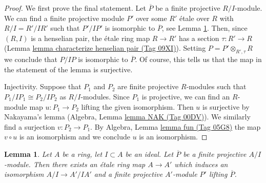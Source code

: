 \documentclass{amsart}
\theoremstyle{plain}
\newtheorem{lemma}[subsection]{Lemma}
\theoremstyle{definition}
\theoremstyle{remark}
\numberwithin{equation}{subsection}
\begin{document}
\begin{proof}
We first prove the final statement. Let $\overline{P}$ be a finite
projective $R/I$-module. We can find a finite projective module $P'$
over some $R'$ \'etale over $R$ with $R/I = R'/IR'$ such that
$P'/IP'$ is isomorphic to $\overline{P}$, see
Lemma \ref{more-algebra-lemma-lift-projective-module}.
Then, since $(R, I)$ is a henselian pair, the \'etale ring map $R \to R'$ has
a section $\tau : R' \to R$ (Lemma \href{https://stacks.math.columbia.edu/tag/09XI}{lemma characterize henselian pair (Tag 09XI)}).
Setting $P = P' \otimes_{R', \tau} R$ we conclude that $P/IP$
is isomorphic to $\overline{P}$. Of course, this tells us that
the map in the statement of the lemma is surjective.

\medskip\noindent
Injectivity. Suppose that $P_1$ and $P_2$ are finite projective $R$-modules such
that $P_1/IP_1 \cong P_2/IP_2$ as $R/I$-modules. Since $P_1$ is projective,
we can find an $R$-module map $u : P_1 \to P_2$ lifting the given isomorphism.
Then $u$ is surjective by Nakayama's lemma
(Algebra, Lemma \href{https://stacks.math.columbia.edu/tag/00DV}{lemma NAK (Tag 00DV)}).
We similarly find a surjection $v : P_2 \to P_1$.
By Algebra, Lemma \href{https://stacks.math.columbia.edu/tag/05G8}{lemma fun (Tag 05G8)} the map $v \circ u$
is an isomorphism and we conclude $u$ is an isomorphism.
\end{proof}


\begin{lemma}
\label{more-algebra-lemma-lift-projective-module}
Let $A$ be a ring, let $I \subset A$ be an ideal.
Let $\overline{P}$ be a finite projective $A/I$-module.
Then there exists an \'etale ring map $A \to A'$ which induces
an isomorphism $A/I \to A'/IA'$ and a finite projective
$A'$-module $P'$ lifting $\overline{P}$.
\end{lemma}
\end{document}
